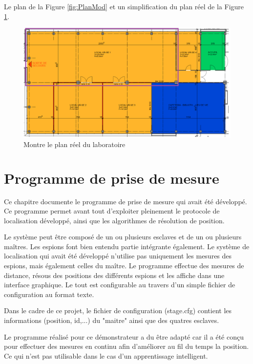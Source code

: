 Le plan de la Figure \ref{fig:PlanMod} et un simplification du plan réel de la Figure \ref{fig:PlanRe}.

\begin{figure}[htp]
	\begin{center}
		\includegraphics[scale=0.5]{figures/PlanRe.PNG}
		\caption{Montre le plan réel du laboratoire}
		\label{fig:PlanRe} %
	\end{center}
\end{figure}


\section{Programme de prise de mesure \cite{MIC}}

Ce chapitre documente le programme de prise de mesure qui avait été développé. Ce programme permet avant tout d’exploiter pleinement le protocole de localisation développé, ainsi que les algorithmes de résolution de position. 

Le système peut être composé de un ou plusieurs esclaves et de un ou plusieurs maîtres. Les espions font bien entendu partie intégrante également. Le système de localisation qui avait été développé n’utilise pas uniquement les mesures des espions, mais également celles du maître. Le programme effectue des mesures de distance, résous des positions des différents espions et les affiche dans une interface graphique. Le tout est configurable au travers d’un simple fichier de configuration au format texte.

Dans le cadre de ce projet, le fichier de configuration (stage.cfg) contient les informations (position, id,...) du "maitre" ainsi que des quatres esclaves. 

Le programme réalisé pour ce démonstrateur a du être adapté car il a été conçu pour effectuer des mesures en continu afin d'améliorer au fil du temps la position. Ce qui n'est pas utilisable dans le cas d'un apprentissage intelligent.

